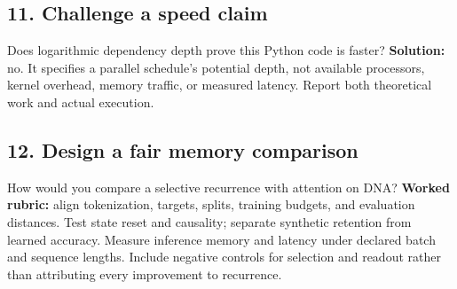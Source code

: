 \subsection*{11. Challenge a speed claim}
Does logarithmic dependency depth prove this Python code is faster?
\textbf{Solution:} no. It specifies a parallel schedule's potential
depth, not available processors, kernel overhead, memory traffic, or
measured latency. Report both theoretical work and actual execution.

\subsection*{12. Design a fair memory comparison}
How would you compare a selective recurrence with attention on DNA?
\textbf{Worked rubric:} align tokenization, targets, splits, training
budgets, and evaluation distances. Test state reset and causality;
separate synthetic retention from learned accuracy. Measure inference
memory and latency under declared batch and sequence lengths. Include
negative controls for selection and readout rather than attributing
every improvement to recurrence.
